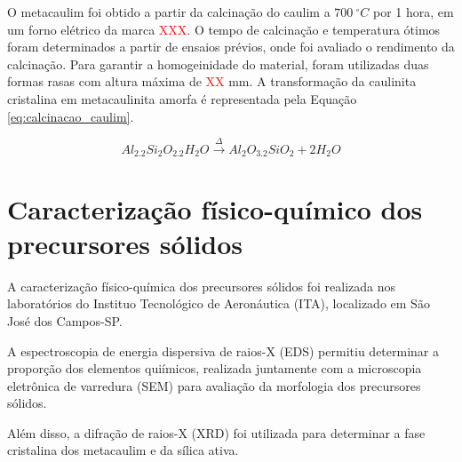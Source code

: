 O metacaulim foi obtido a partir da calcinação do caulim a $700\ ^\circ C$ por 1 hora, em um forno elétrico da marca \textcolor{red}{XXX}.
O tempo de calcinação e temperatura ótimos foram determinados a partir de ensaios prévios, onde foi avaliado o rendimento da calcinação.
Para garantir a homogeinidade do material, foram utilizadas duas formas rasas com altura máxima de \textcolor{red}{XX} mm.
A transformação da caulinita cristalina em metacaulinita amorfa é representada pela Equação \ref{eq:calcinacao_caulim}.

\begin{equation}
    \label{eq:calcinacao_caulim}
        Al_2.2Si_2O_2.2H_2O \xrightarrow{\Delta} Al_2O_3.2SiO_2 + 2 H_2O
\end{equation}

\section{Caracterização físico-químico dos precursores sólidos}
\label{sec:caracterizacao_fisico_quimica_dos_precursores_solidos}

A caracterização físico-química dos precursores sólidos foi realizada nos laboratórios do Instituo Tecnológico de Aeronáutica (ITA), localizado em São José dos Campos-SP.

A espectroscopia de energia dispersiva de raios-X (EDS) permitiu determinar a proporção dos elementos quiímicos, realizada juntamente com a microscopia eletrônica de varredura (SEM) para avaliação da morfologia dos precursores sólidos.

Além disso, a difração de raios-X (XRD) foi utilizada para determinar a fase cristalina dos metacaulim e da sílica ativa.


